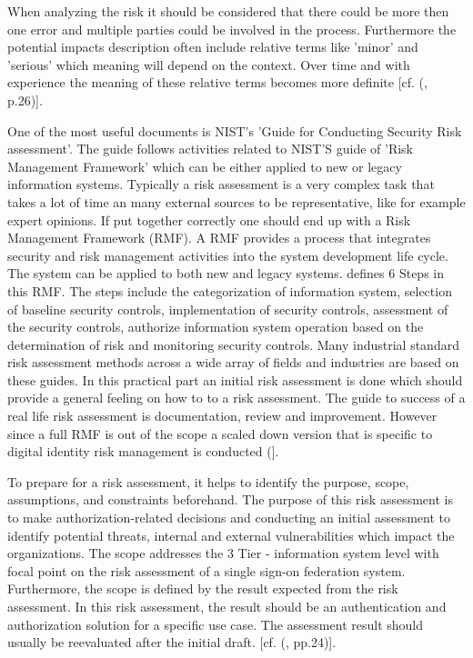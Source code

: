 When analyzing the risk it should be considered that there could be more then one error and multiple parties could be involved in the process. Furthermore the potential impacts description often include relative terms like 'minor' and 'serious' which meaning will depend on the context. Over time and with experience the meaning of these relative terms becomes more definite [cf. (\cite{NIST:2017:DIG}, p.26)].
 
One of the most useful documents is NIST's 'Guide for Conducting Security Risk assessment'. The guide follows activities related to NIST'S guide of 'Risk Management Framework' which can be either applied to new or legacy information systems. Typically a risk assessment is a very complex task that takes a lot of time an many external sources to be representative, like for example expert opinions. If put together correctly one should end up with a Risk Management Framework (RMF). A RMF provides a process that integrates security and risk management activities into the system development life cycle. The system can be applied to both new and legacy systems. \cite{NIST:2018:RMF} defines 6 Steps in this RMF. The steps include the categorization of information system, selection of baseline security controls, implementation of security controls, assessment of the security controls, authorize information system operation based on the determination of risk and monitoring security controls. Many industrial standard risk assessment methods across a wide array of fields and industries are based on these guides.  In this practical part an initial risk assessment is done which should provide a general feeling on how to to a risk assessment. The guide to success of a real life risk assessment is documentation, review and improvement.  However since a full RMF is out of the scope a scaled down version that is specific to digital identity risk management is conducted  (\cite{NIST:2018:RMF}].


To prepare for a risk assessment, it helps to identify the purpose, scope, assumptions, and constraints beforehand. The purpose of this risk assessment is to make authorization-related decisions and conducting an initial assessment to identify potential threats, internal and external vulnerabilities which impact the organizations. The scope addresses the 3 Tier -  information system level with focal point on the risk assessment of a single sign-on federation system. Furthermore, the scope is defined by the result expected from the risk assessment. In this risk assessment, the result should be an authentication and authorization solution for a specific use case. The assessment result should usually be reevaluated after the initial draft. [cf. (\cite{NIST:2012:GCRA}, pp.24)].

